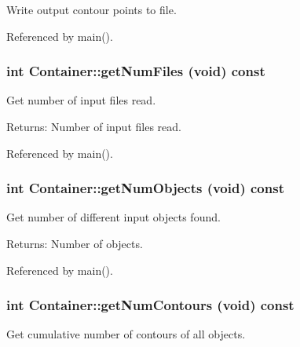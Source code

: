 Write output contour points to file. 

Referenced by main().\hypertarget{classContainer_1543921a3bdcf71968d6c78fa8adf67c}{
\subsubsection[getNumFiles]{\setlength{\rightskip}{0pt plus 5cm}int Container::getNumFiles (void) const}}
\label{classContainer_1543921a3bdcf71968d6c78fa8adf67c}


Get number of input files read. \begin{Desc}
\item[Returns:]Number of input files read. \end{Desc}


Referenced by main().\hypertarget{classContainer_c78719a0e41e087c64a6e3dee6bebdff}{
\subsubsection[getNumObjects]{\setlength{\rightskip}{0pt plus 5cm}int Container::getNumObjects (void) const}}
\label{classContainer_c78719a0e41e087c64a6e3dee6bebdff}


Get number of different input objects found. \begin{Desc}
\item[Returns:]Number of objects. \end{Desc}


Referenced by main().\hypertarget{classContainer_0961f692ac0f51aa90643d2c4b7e01ff}{
\subsubsection[getNumContours]{\setlength{\rightskip}{0pt plus 5cm}int Container::getNumContours (void) const}}
\label{classContainer_0961f692ac0f51aa90643d2c4b7e01ff}


Get cumulative number of contours of all objects. 

